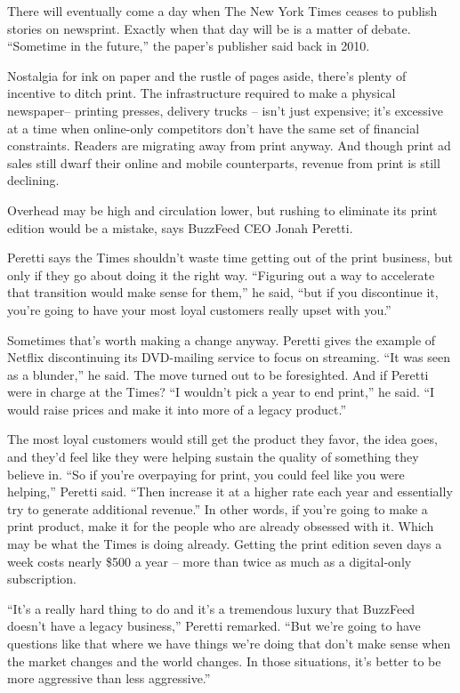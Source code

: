 There will eventually come a day when The New York Times ceases to publish stories on newsprint. Exactly when that day will be is a matter of debate. ``Sometime in the future,'' the paper's publisher said back in 2010.


Nostalgia for ink on paper and the rustle of pages aside, there's plenty of incentive to ditch print. The infrastructure required to make a physical newspaper– printing presses, delivery trucks – isn't just expensive; it's excessive at a time when online-only competitors don't have the same set of financial constraints. Readers are migrating away from print anyway. And though print ad sales still dwarf their online and mobile counterparts, revenue from print is still declining.


Overhead may be high and circulation lower, but rushing to eliminate its print edition would be a mistake, says BuzzFeed CEO Jonah Peretti.


Peretti says the Times shouldn't waste time getting out of the print business, but only if they go about doing it the right way. ``Figuring out a way to accelerate that transition would make sense for them,'' he said, ``but if you discontinue it, you're going to have your most loyal customers really upset with you.''


Sometimes that's worth making a change anyway. Peretti gives the example of Netflix discontinuing its DVD-mailing service to focus on streaming. ``It was seen as a blunder,'' he said. The move turned out to be foresighted. And if Peretti were in charge at the Times? ``I wouldn't pick a year to end print,'' he said. ``I would raise prices and make it into more of a legacy product.''


The most loyal customers would still get the product they favor, the idea goes, and they'd feel like they were helping sustain the quality of something they believe in. ``So if you're overpaying for print, you could feel like you were helping,'' Peretti said. ``Then increase it at a higher rate each year and essentially try to generate additional revenue.'' In other words, if you're going to make a print product, make it for the people who are already obsessed with it. Which may be what the Times is doing already. Getting the print edition seven days a week costs nearly \$500 a year – more than twice as much as a digital-only subscription.


``It's a really hard thing to do and it's a tremendous luxury that BuzzFeed doesn't have a legacy business,'' Peretti remarked. ``But we're going to have questions like that where we have things we're doing that don't make sense when  the market changes and the world changes. In those situations, it's better to be more aggressive than less aggressive.''